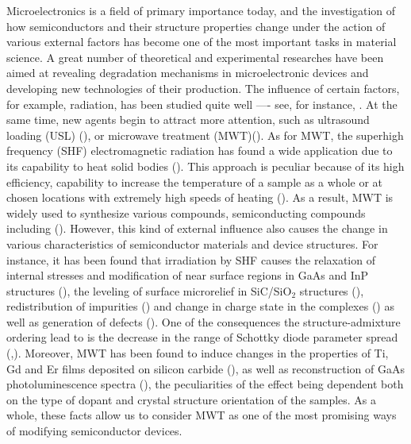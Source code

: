 \documentclass[final,3p,times,twocolumn,authoryear]{elsarticle}
\begin{document}
Microelectronics is a field of primary importance today, and the investigation of how semiconductors and their structure properties change under the action of various external factors has become one of the most important tasks in material science.
A great number of theoretical and experimental researches have been aimed at revealing degradation mechanisms in microelectronic devices and developing new technologies of their production.
The influence of certain factors, for example, radiation, has been studied quite well ---- see, for instance, \cite{KozlovsEn,RadiationEffectsBook}.
At the same time, new agents begin to attract more attention, such as ultrasound loading (USL)
(\cite{Olikh2018JAP,Olikh2006TPL}),
or microwave treatment (MWT)(\cite{MW:Rev,ZOHM2000,BHUNIA1998,Bacherikov2003En,Pashkov1994En,
BoltovetsEn,Milenin1994En,BelyaevIntac,ASHKINADZE1996,ProcSPIE,Belyaev1998JTFEn,
Bacherikov2008En,Konakova2015En,Konakova2012FTPEn}).
As for MWT, the superhigh frequency (SHF) electromagnetic radiation has found a wide application due to its capability to heat solid bodies  (\cite{MW:Rev,ZOHM2000}).
This approach is peculiar because of its high efficiency, capability to increase the temperature
of a sample as a whole or at chosen locations with extremely high speeds of heating (\cite{MW:Rev}).
As a result, MWT is widely used to synthesize various compounds, semiconducting compounds including (\cite{MW:Rev,BHUNIA1998}).
However, this kind of external influence also causes the change in various characteristics of semiconductor materials and device structures.
For instance, it has been found that irradiation by  SHF causes the relaxation of internal stresses and modification of near surface regions
in GaAs and InP structures (\cite{BoltovetsEn,Pashkov1994En,Milenin1994En,BelyaevIntac,ProcSPIE,Konakova2015En,Konakova2012FTPEn}),
the leveling of surface microrelief in SiC/SiO$_2$ structures (\cite{Bacherikov2003En}),
redistribution of impurities (\cite{Bacherikov2003En,Belyaev1998JTFEn,Konakova2015En})
and change in charge state in the complexes (\cite{Milenin1994En}) as well as generation of defects (\cite{Belyaev1998JTFEn}).
One of the consequences the structure-admixture ordering  lead to is the decrease in the range of
Schottky diode parameter spread (\cite{Milenin1994En},\cite{Belyaev1998JTFEn}).
Moreover, MWT has been found to induce changes in the properties of Ti, Gd and Er films deposited on silicon carbide (\cite{Bacherikov2008En}),
as well as reconstruction of GaAs photoluminescence spectra (\cite{BelyaevIntac,ProcSPIE,Belyaev1998JTFEn}),
the peculiarities of the effect being dependent both on the type of dopant and crystal structure orientation of the samples.
As a whole, these facts allow us to consider MWT as one of the most promising ways of modifying semiconductor devices.
\end{document}
